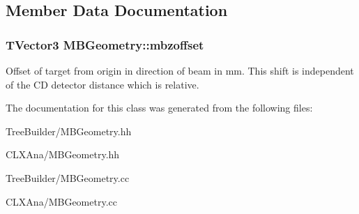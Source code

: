 \subsection{Member Data Documentation}
\hypertarget{class_m_b_geometry_a687268aeee7a0e2edc0486a76a07affe}{
\subsubsection[{mbzoffset}]{\setlength{\rightskip}{0pt plus 5cm}T\-Vector3 M\-B\-Geometry\-::mbzoffset\hspace{0.3cm}{\ttfamily [private]}}}\label{class_m_b_geometry_a687268aeee7a0e2edc0486a76a07affe}
Offset of target from origin in direction of beam in mm. This shift is independent of the C\-D detector distance which is relative. 

The documentation for this class was generated from the following files\-:\begin{DoxyCompactItemize}
\item 
Tree\-Builder/M\-B\-Geometry.\-hh\item 
C\-L\-X\-Ana/M\-B\-Geometry.\-hh\item 
Tree\-Builder/M\-B\-Geometry.\-cc\item 
C\-L\-X\-Ana/M\-B\-Geometry.\-cc\end{DoxyCompactItemize}
